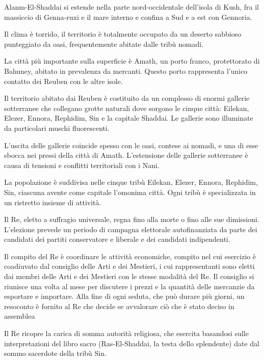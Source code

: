 \Geografia Alanm-El-Shaddai si estende nella parte nord-occidentale
dell'isola di Kush, fra il massiccio di Genna-ruxi e il mare
interno e confina a Sud e a est con Gennoria.

Il clima \`e torrido, il territorio \`e totalmente occupato da un
deserto sabbioso punteggiato da oasi, frequentemente abitate dalle
trib\`u nomadi.

La citt\`a pi\`u importante sulla superficie \`e Amath, un porto
franco, protettorato di Bahuney, abitato in prevalenza da mercanti.
Questo porto rappresenta l'unico contatto dei Reuben con le altre
isole.

Il territorio abitato dai Reuben \`e costituito da un complesso di
enormi gallerie sotterranee che collegano grotte naturali dove sorgono
le cinque citt\`a: Eilekan, Elezer, Ennora, Rephidim, Sin e la
capitale Shaddai. Le gallerie sono illuminate da particolari muschi
fluorescenti.

L'uscita delle gallerie coincide spesso con le oasi, contese ai
nomadi, e una di esse sbocca nei pressi della citt\`a di Amath.
L'estensione delle gallerie sotterranee \`e causa di tensioni e
conflitti territoriali con i Nani.

\Politica La popolazione \`e suddivisa nelle cinque trib\`u Eilekan, Elezer,
Ennora, Rephidim, Sin, ciascuna avente come capitale l'omonima
citt\`a. Ogni trib\`u \`e specializzata in un ristretto insieme di
attivit\`a.

Il Re, eletto a suffragio universale, regna fino alla morte o fino
alle sue dimissioni. L'elezione prevede un periodo di campagna
elettorale autofinanziata da parte dei candidati dei partiti
conservatore e liberale e dei candidati indipendenti. 

Il compito del Re \`e coordinare le attivit\`a economiche, compito nel
cui esercizio \`e coadiuvato dal consiglio delle Arti e dei Mestieri,
i cui rappresentanti sono eletti dai membri delle Arti e dei Mestieri
con le stesse modalit\`a del Re.  Il consiglio si riunisce una volta
al mese per discutere i prezzi e la quantit\`a delle mercanzie da
esportare e importare. Alla fine di ogni seduta, che pu\`o durare
pi\`u giorni, un resoconto \`e fornito al Re che decide se avvalorare
ci\`o che \`e stato deciso in assemblea
  
Il Re ricopre la carica di somma autorit\`a religiosa, che esercita
basandosi sulle interpretazioni del libro sacro (Ras-El-Shaddai, la
testa dello splendente) date dal sommo sacerdote della trib\`u Sin.

